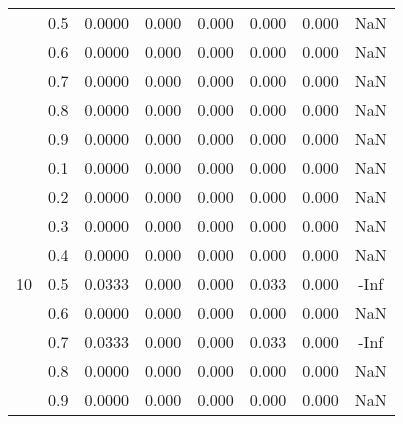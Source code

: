 \documentclass[11pt,a4paper]{report}
\begin{document}
\begin{longtable}{ | c | c || c | c | c | c | c | c | }
 & 0.5 & 0.0000 & 0.000 & 0.000 & 0.000 & 0.000 & NaN \\
 & 0.6 & 0.0000 & 0.000 & 0.000 & 0.000 & 0.000 & NaN \\
 & 0.7 & 0.0000 & 0.000 & 0.000 & 0.000 & 0.000 & NaN \\
 & 0.8 & 0.0000 & 0.000 & 0.000 & 0.000 & 0.000 & NaN \\
 & 0.9 & 0.0000 & 0.000 & 0.000 & 0.000 & 0.000 & NaN \\
 \hline
\multirow{9}{*}{10} & 0.1 & 0.0000 & 0.000 & 0.000 & 0.000 & 0.000 & NaN \\
 & 0.2 & 0.0000 & 0.000 & 0.000 & 0.000 & 0.000 & NaN \\
 & 0.3 & 0.0000 & 0.000 & 0.000 & 0.000 & 0.000 & NaN \\
 & 0.4 & 0.0000 & 0.000 & 0.000 & 0.000 & 0.000 & NaN \\
 & 0.5 & 0.0333 & 0.000 & 0.000 & 0.033 & 0.000 & -Inf \\
 & 0.6 & 0.0000 & 0.000 & 0.000 & 0.000 & 0.000 & NaN \\
 & 0.7 & 0.0333 & 0.000 & 0.000 & 0.033 & 0.000 & -Inf \\
 & 0.8 & 0.0000 & 0.000 & 0.000 & 0.000 & 0.000 & NaN \\
 & 0.9 & 0.0000 & 0.000 & 0.000 & 0.000 & 0.000 & NaN \\
 \hline
\hline
\end{longtable}
\end{document}
